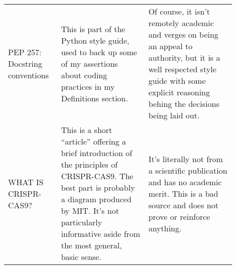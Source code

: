 \documentclass{article}
\begin{document}
\begin{center}
{\begin{longtable}{p{0.2\linewidth} p{0.35\linewidth} p{0.35\linewidth}}
    \\

    PEP 257: Docstring conventions \citep*{PEPDocstrings2014Goodger} &

    This is part of the Python style guide, used to back up some of my
    assertions about coding practices in my Definitions section. &

    Of course, it isn't remotely academic and verges on being an appeal to
    authority, but it is a well respected style guide with some explicit
    reasoning behing the decisions being laid out.

    \\

    WHAT IS CRISPR-CAS9? \citep*{CRISPRDailymail} &

    This is a short ``article'' offering a brief introduction of the principles
    of CRISPR-CAS9. The best part is probably a diagram produced by MIT. It's
    not particularly informative aside from the most general, basic sense. &

    It's literally not from a scientific publication and has no academic merit.
    This is a bad source and does not prove or reinforce anything.

    \\

    \bottomrule
    \end{longtable}
    }
    \end{center}

\nocite{*}


\end{document}
